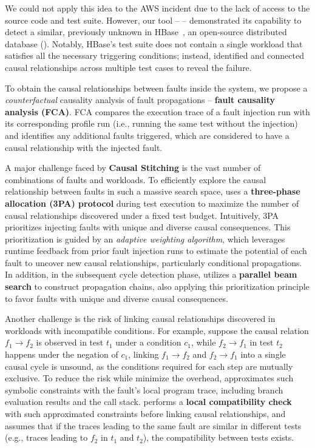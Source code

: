 We could not apply this idea to the AWS incident due to the lack of access to the source code and test suite. 
However, our tool -- \tool -- demonstrated its capability to detect a similar, previously unknown \vcs in HBase~\cite{apache-hbase}, an open-source distributed database (). 
Notably, HBase's test suite does not contain a single workload that satisfies all the necessary triggering conditions; 
instead, \tool identified and connected causal relationships across multiple test cases to reveal the failure.


To obtain the causal relationships between faults inside the system, we propose a \textit{counterfactual} causality analysis of fault propagations -- \textbf{fault causality analysis (FCA)}.
FCA compares the execution trace of a fault injection run with its corresponding profile run (i.e., running the same test without the injection) and identifies any additional faults triggered, which are considered to have a causal relationship with the injected fault. 



A major challenge faced by \textbf{Causal Stitching} 
is the vast number of combinations of faults and workloads. 
To efficiently explore the causal relationship between faults 
in such a massive search space, 
\tool uses a \textbf{three-phase allocation (3PA) protocol} during test execution to maximize the number of causal relationships discovered under a fixed test budget. 
Intuitively, 
3PA prioritizes injecting faults with unique and diverse causal consequences. 
This prioritization is guided by 
an \textit{adaptive weighting algorithm}, 
which leverages runtime feedback from prior fault injection runs 
to estimate the potential of each fault to 
uncover new causal relationships, particularly conditional propagations.
In addition, 
in the subsequent cycle detection phase, 
\tool utilizes a \textbf{parallel beam search} 
to construct propagation chains, 
also applying this prioritization principle 
to favor faults with unique and diverse causal consequences. 


Another challenge is the risk of linking causal relationships 
discovered in workloads with incompatible conditions. 
For example, 
suppose the causal relation 
$f_1 \rightarrow f_2$ is observed in test $t_1$ under a condition $c_1$, 
while $f_2 \rightarrow f_1$ in test $t_2$ happens under the negation of $c_1$, 
linking $f_1 \rightarrow f_2$ and $f_2 \rightarrow f_1$ into a single causal cycle is unsound, as the conditions required for each step are mutually exclusive. 
To reduce the risk while minimize the overhead, \tool approximates such symbolic constraints with the fault's local program trace, including branch evaluation results and the call stack.
\tool performs a \textbf{local compatibility check} with such approximated constraints 
before linking causal relationships, 
and assumes that if the traces leading to the same fault are similar in different tests (e.g., traces leading to $f_2$ in $t_1$ and $t_2$), the compatibility between tests exists. 





